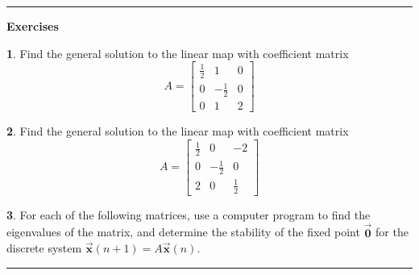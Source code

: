 \documentclass[reqno]{immbook}
\newcommand{\BX}{\vec{\textbf{x}}}
\newcommand{\BZero}{\vec{\textbf{0}}}  %
\newcommand{\ds}{\displaystyle}
\numberwithin{equation}{chapter}
\numberwithin{question}{section}
\numberwithin{theorem}{chapter}
\numberwithin{figure}{chapter}
\theoremstyle{definition}
\newtheorem{exercise}{}[section]
\newenvironment{exercises}%
{%
\medskip\hrule\medskip\noindent\textbf{Exercises}%
}%
{%
\medskip\hrule
}
\begin{document}
\newpage

\begin{exercises}
\begin{exercise}
Find the general solution to the linear map with coefficient matrix
\begin{equation}
   A = \begin{bmatrix}
            \frac{1}{2} &  1  &  0 \\
              0         & -\frac{1}{2}  &  0 \\
              0         &  1  &  2
       \end{bmatrix}
\end{equation}
\end{exercise}
\begin{exercise}
Find the general solution to the linear map with coefficient matrix
\begin{equation}
   A = \begin{bmatrix}
            \frac{1}{2} &  0  &  -2 \\
              0         & -\frac{1}{2}  &  0 \\
              2         &  0  &  \frac{1}{2}
       \end{bmatrix}
\end{equation}
\end{exercise}
\begin{exercise}
For each of the following matrices,
use a computer program to find the
eigenvalues of the matrix, and determine
the stability of the fixed point $\BZero$
for the discrete system $\BX(n+1) = A\BX(n)$.
\end{exercise}
\end{exercises}
\end{document}
